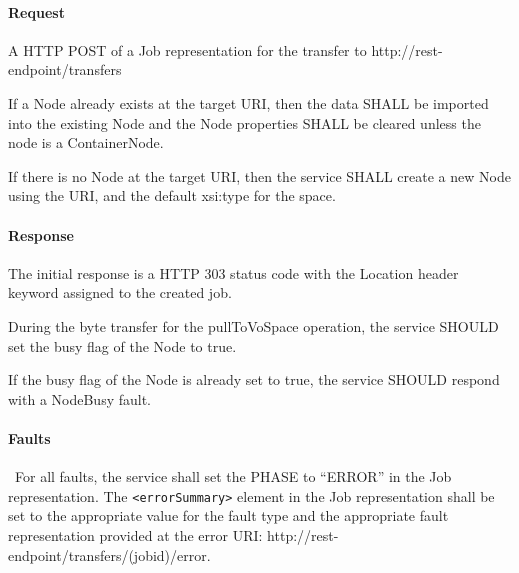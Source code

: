 \documentclass[11pt,a4paper]{ivoa}
\begin{document}
\paragraph{Request}
A HTTP POST of a Job representation for the transfer to http://rest-endpoint/transfers

If a Node already exists at the target URI, then the data SHALL be imported into the existing Node and the Node properties SHALL be cleared unless the node is a ContainerNode.

If there is no Node at the target URI, then the service SHALL create a new Node using the URI, and the default xsi:type for the space.

\paragraph{Response}
The initial response is a HTTP 303 status code with the Location header keyword assigned to the created job.

During the byte transfer for the pullToVoSpace operation, the service SHOULD set the busy flag of the Node to true.

If the busy flag of the Node is already set to true, the service SHOULD respond with a NodeBusy fault.

\paragraph{Faults}\
For all faults, the service shall set the PHASE to ``ERROR'' in the Job representation. The \verb|<errorSummary>| element in the Job representation shall be set to the appropriate value for the fault type and the appropriate fault representation provided at the error URI: http://rest-endpoint/transfers/(jobid)/error.
\end{document}
